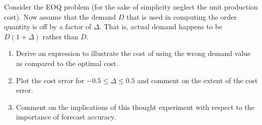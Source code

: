 \begin{exercise}
Consider the EOQ problem (for the sake of simplicity neglect the unit production cost). Now assume that the demand $D$ that is used in computing the order quantity is off by a factor of $\Delta$. That is, actual demand happens to be $D(1+\Delta)$ rather than $D$. 
\begin{enumerate}
\item Derive an expression to illustrate the cost of using the wrong demand value as compared to the optimal cost. 
\item Plot the cost error for $-0.5\leq \Delta\leq 0.5$ and comment on the extent of the cost error.
\item Comment on the implications of this thought experiment with respect to the importance of forecast accuracy.
\end{enumerate}

\end{exercise}
